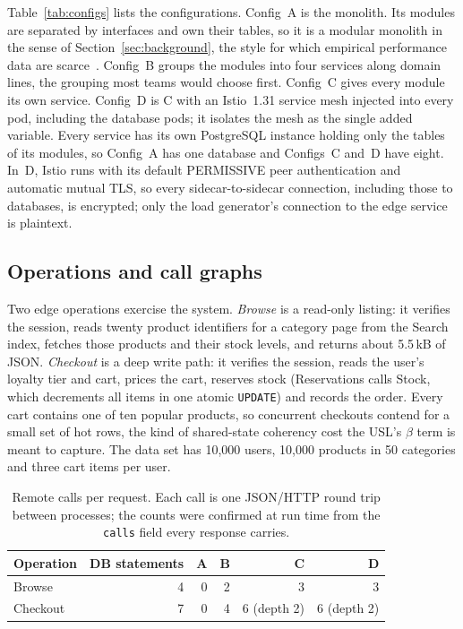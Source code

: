 Table~\ref{tab:configs} lists the configurations. Config~A is the monolith. Its modules are separated by
interfaces and own their tables, so it is a modular monolith in the sense of Section~\ref{sec:background}, the
style for which empirical performance data are scarce~\cite{AlQoran2025}. Config~B groups the modules into
four services along domain lines, the grouping most teams would choose first. Config~C gives every module its own
service. Config~D is C with an Istio~1.31 service mesh injected into every pod, including the database pods;
it isolates the mesh as the single added variable. Every service has
its own PostgreSQL instance holding only the tables of its modules, so Config~A has one database and
Configs~C and~D have eight. In~D, Istio runs with its default PERMISSIVE peer authentication and automatic
mutual TLS, so every sidecar-to-sidecar connection, including those to databases, is encrypted; only the
load generator's connection to the edge service is plaintext.

\subsection{Operations and call graphs}
\label{sec:ops}

Two edge operations exercise the system. \emph{Browse} is a read-only listing: it verifies the session,
reads twenty product identifiers for a category page from the Search index, fetches those products and
their stock levels, and returns about 5.5\,kB of JSON. \emph{Checkout} is a deep write path: it verifies the
session, reads the user's loyalty tier and cart, prices the cart, reserves stock (Reservations calls Stock,
which decrements all items in one atomic \texttt{UPDATE}) and records the order. Every cart contains one of
ten popular products, so concurrent checkouts contend for a small set of hot rows, the kind of shared-state
coherency cost the USL's $\beta$ term is meant to capture. The data set has 10{,}000 users, 10{,}000
products in 50 categories and three cart items per user.

\begin{table}[t]
\caption{Remote calls per request. Each call is one JSON/HTTP round trip between processes; the counts were
confirmed at run time from the \texttt{calls} field every response carries.}
\label{tab:hops}
\centering\small
\begin{tabular}{@{}lrrrrr@{}}
\toprule
Operation & DB statements & A & B & C & D \\
\midrule
Browse   & 4 & 0 & 2 & 3 & 3 \\
Checkout & 7 & 0 & 4 & 6 (depth 2) & 6 (depth 2) \\
\bottomrule
\end{tabular}
\end{table}

